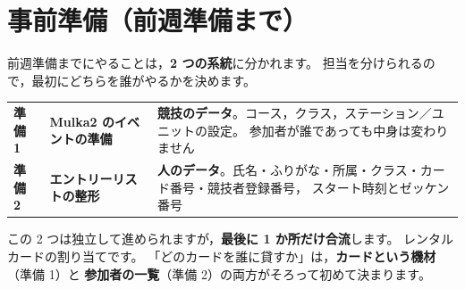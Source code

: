 \chapter{事前準備（前週準備まで）}

前週準備までにやることは，\textbf{2 つの系統}に分かれます。
担当を分けられるので，最初にどちらを誰がやるかを決めます。

\begin{center}
\small
\begin{tabular}{@{}P{8mm}P{44mm}P{92mm}@{}}
\toprule
 &  &  \\
\midrule
\textbf{準備 1} & \textbf{Mulka2 のイベントの準備} &
  \textbf{競技のデータ}。コース，クラス，ステーション／ユニットの設定。
  参加者が誰であっても中身は変わりません \\
\textbf{準備 2} & \textbf{エントリーリストの整形} &
  \textbf{人のデータ}。氏名・ふりがな・所属・クラス・カード番号・競技者登録番号，
  スタート時刻とゼッケン番号 \\
\bottomrule
\end{tabular}
\end{center}

この 2 つは独立して進められますが，\textbf{最後に 1 か所だけ合流}します。
レンタルカードの割り当てです。
「どのカードを誰に貸すか」は，\textbf{カードという機材}（準備 1）と
\textbf{参加者の一覧}（準備 2）の両方がそろって初めて決まります。

